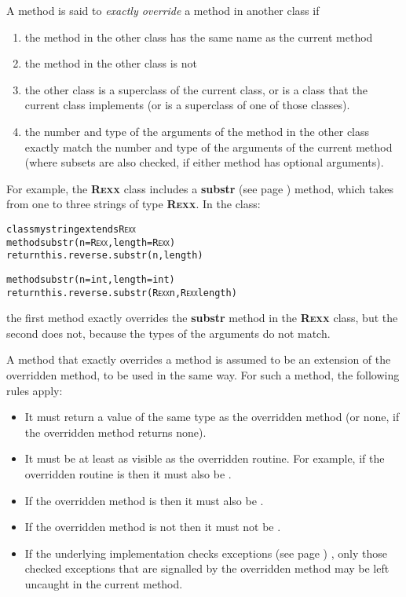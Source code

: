 A method is said to \emph{exactly override} a method in another class
if
\begin{enumerate}
\item the method in the other class has the same name as the current method
\item the method in the other class is not 
\item the other class is a superclass of the current class, or is a class
that the current class implements (or is a superclass of one of those
classes).
\item the number and type of the arguments of the method in the other
class exactly match the number and type of the arguments of the current
method (where subsets are also checked, if either method has optional
arguments).
\end{enumerate}
For example, the \textbf{R\textsc{exx}} class includes a
 \textbf{substr} (see page \pageref{refsubstr})  method, which takes from one to
three strings of type \textbf{R\textsc{exx}}.  In the class:
\begin{alltt}
class mystring extends R\textsc{exx}
  method substr(n=R\textsc{exx}, length=R\textsc{exx})
    return this.reverse.substr(n, length)

  method substr(n=int, length=int)
    return this.reverse.substr(R\textsc{exx} n, R\textsc{exx} length)
\end{alltt}
the first method exactly overrides the \textbf{substr} method in
the \textbf{R\textsc{exx}} class, but the second does not, because the types of
the arguments do not match.
 
A method that exactly overrides a method is assumed to be an extension
of the overridden method, to be used in the same way.  For such a
method, the following rules apply:
\begin{itemize}
\item It must return a value of the same type as the overridden method (or
none, if the overridden method returns none).
\item It must be at least as visible as the overridden routine.
For example, if the overridden routine is  then it must
also be .
\item If the overridden method is  then it must also
be .
\item If the overridden method is not  then it must
not be .
\item If the underlying implementation checks  exceptions (see page \pageref{refexcep}) ,
only those checked exceptions that are signalled by the overridden
method may be left uncaught in the current method.
\end{itemize}
